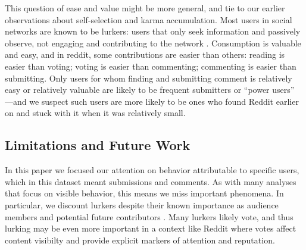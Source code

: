  
This question of ease and value might be more general, and tie to our earlier observations about self-selection and karma accumulation.  Most users in social networks are known to be lurkers: users that only seek information and passively observe, not engaging and contributing to the network \cite{Rafaeli2004, Nonnecke2000}.  Consumption is valuable and easy, and in reddit, some contributions are easier than others: reading is easier than voting; voting is easier than commenting; commenting is easier than submitting.  Only users for whom finding and submitting comment is relatively easy or relatively valuable are likely to be frequent submitters or ``power users'' \cite{Panciera2009, Kittur2007}---and we suspect such users are more likely to be ones who found Reddit earlier on and stuck with it when it was relatively small.


\subsection{Limitations and Future Work}

In this paper we focused our attention on behavior attributable to specific users, which in this dataset meant submissions and comments.  As with many analyses that focus on visible behavior, this means we miss important phenomena.  In particular, we discount lurkers despite their known importance as audience members \cite{} and potential future contributors \cite{}.  Many lurkers likely vote, and thus lurking may be even more important in a context like Reddit where votes affect content visibilty and provide explicit markers of attention and reputation.  

